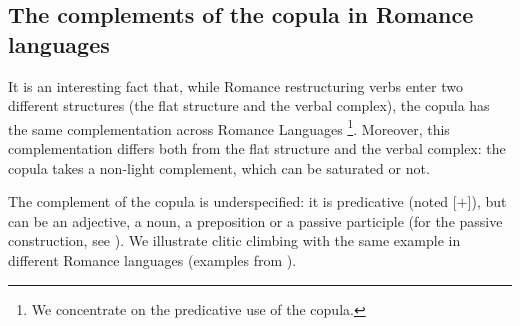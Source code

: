 \documentclass[output=paper
                ,modfonts
                ,nonflat
	        ,collection
	        ,collectionchapter
	        ,collectiontoclongg
 	        ,biblatex
                ,babelshorthands
                ,newtxmath
                ,draftmode
                ,colorlinks, citecolor=brown
]{./langsci/langscibook}
\begin{document}
{\begin{exe} 
        \label{GSexemple29}
\end{exe}

\subsection{The complements of the copula in Romance languages}\label{GSsection3.4}

It is an interesting fact that, while Romance restructuring verbs enter two different structures (the flat structure and the verbal complex), the copula has the same complementation across Romance Languages \citep{abeille2001varieties, AG2010}\footnote{We concentrate on the predicative use of the copula.}. Moreover, this complementation differs both from the flat structure and the verbal complex: the copula takes a non-light complement, which can be saturated or not. 

The complement of the copula is underspecified: it is predicative (noted [\prd $+$]), but can be an adjective, a noun, a preposition or a passive participle (for the passive construction, see \citealt{AG2002b-u}). We illustrate clitic climbing with the same example in different Romance languages (examples from \citealt{AG2010}).

\eal
	\label{GSexemple30} 
	\label{GSexemple30a}

	\label{GSexemple30b}
		
	\label{GSexemple30c}
		
	\label{GSexemple30d}
		
}
\end{document}
